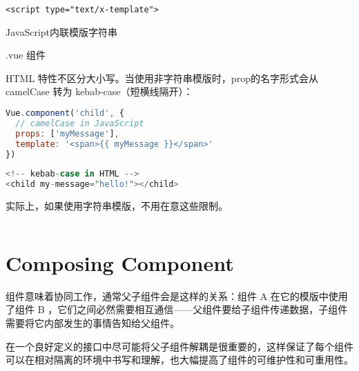 \begin{compactitem}
\item \texttt{<script type="text/x-template">}
\item JavaScript内联模版字符串
\item .vue 组件
\end{compactitem}

HTML 特性不区分大小写。当使用非字符串模版时，prop的名字形式会从 camelCase 转为 kebab-case（短横线隔开）：



\begin{lstlisting}[language=JavaScript]
Vue.component('child', {
  // camelCase in JavaScript
  props: ['myMessage'],
  template: '<span>{{ myMessage }}</span>'
})
\end{lstlisting}



\begin{lstlisting}[language=JavaScript]
<!-- kebab-case in HTML -->
<child my-message="hello!"></child>
\end{lstlisting}

实际上，如果使用字符串模版，不用在意这些限制。

\begin{lstlisting}[language=JavaScript]

\end{lstlisting}






\section{Composing Component}

组件意味着协同工作，通常父子组件会是这样的关系：组件 A 在它的模版中使用了组件 B ，它们之间必然需要相互通信——父组件要给子组件传递数据，子组件需要将它内部发生的事情告知给父组件。

在一个良好定义的接口中尽可能将父子组件解耦是很重要的，这样保证了每个组件可以在相对隔离的环境中书写和理解，也大幅提高了组件的可维护性和可重用性。



\begin{lstlisting}[language=JavaScript]

\end{lstlisting}




\begin{lstlisting}[language=JavaScript]

\end{lstlisting}




